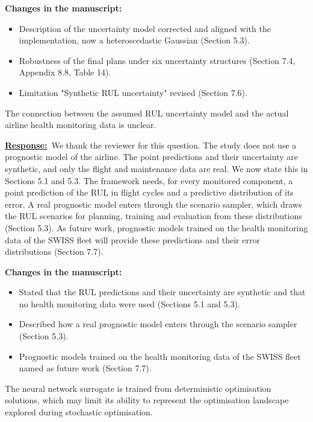 \documentclass{article}
\newcommand{\response}{\vspace{0.1cm}\noindent\underline{\textbf{Response:}}\ }
\newcommand{\changes}{\vspace{0.1cm}\noindent\textbf{Changes in the manuscript:}}
\begin{document}
\changes
\begin{itemize}[nosep]
\item Description of the uncertainty model corrected and aligned with the implementation, now a heteroscedastic Gaussian (Section 5.3).
\item Robustness of the final plans under six uncertainty structures (Section 7.4, Appendix 8.8, Table 14).
\item Limitation "Synthetic RUL uncertainty" revised (Section 7.6).
\end{itemize}

\begin{cmt}{}{}
The connection between the assumed RUL uncertainty model and the actual airline health monitoring data is unclear.
\end{cmt}

\response We thank the reviewer for this question. The study does not use a prognostic model of the airline. The point predictions and their uncertainty are synthetic, and only the flight and maintenance data are real. We now state this in Sections 5.1 and 5.3. The framework needs, for every monitored component, a point prediction of the RUL in flight cycles and a predictive distribution of its error. A real prognostic model enters through the scenario sampler, which draws the RUL scenarios for planning, training and evaluation from these distributions (Section 5.3). As future work, prognostic models trained on the health monitoring data of the SWISS fleet will provide these predictions and their error distributions (Section 7.7).

\changes
\begin{itemize}[nosep]
\item Stated that the RUL predictions and their uncertainty are synthetic and that no health monitoring data were used (Sections 5.1 and 5.3).
\item Described how a real prognostic model enters through the scenario sampler (Section 5.3).
\item Prognostic models trained on the health monitoring data of the SWISS fleet named as future work (Section 7.7).
\end{itemize}

\begin{cmt}{}{}
The neural network surrogate is trained from deterministic optimisation solutions, which may limit its ability to represent the optimisation landscape explored during stochastic optimisation.
\end{cmt}
\end{document}
